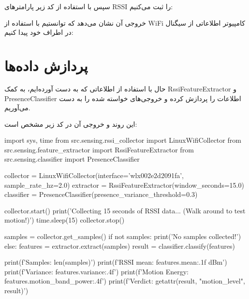 \documentclass[12pt, a4paper]{article}
\newcommand{\lr}[1]{\foreignlanguage{english}{#1}}
\begin{document}
سپس با استفاده از کد زیر پارامترهای \lr{RSSI} را ثبت می‌کنیم:

\begin{otherlanguage}{english}
\end{otherlanguage}

خروجی آن نشان می‌دهد که توانستیم با استفاده از \lr{WiFi} کامپیوتر اطلاعاتی از سیگنال در اطراف خود پیدا کنیم:

\begin{otherlanguage}{english}
\end{otherlanguage}

\section{پردازش داده‌ها}
حال با استفاده از اطلاعاتی که به دست آورده‌ایم، به کمک \lr{RssiFeatureExtractor} و \lr{PresenceClassifier} اطلاعات را پردازش کرده و خروجی‌های خواسته شده را به دست می‌آوریم. 

این روند و خروجی آن در کد زیر مشخص است:

\begin{otherlanguage}{english}
\begin{codebox}
import sys, time
from src.sensing.rssi_collector import LinuxWifiCollector
from src.sensing.feature_extractor import RssiFeatureExtractor
from src.sensing.classifier import PresenceClassifier

collector = LinuxWifiCollector(interface='wlx002e2d2091fa', sample_rate_hz=2.0)
extractor = RssiFeatureExtractor(window_seconds=15.0)
classifier = PresenceClassifier(presence_variance_threshold=0.3)

collector.start()
print('Collecting 15 seconds of RSSI data... (Walk around to test motion!)')
time.sleep(15)
collector.stop()

samples = collector.get_samples()
if not samples:
    print('No samples collected!')
else:
    features = extractor.extract(samples)
    result = classifier.classify(features)
    
    print(f'Samples: {len(samples)}')
    print(f'RSSI mean: {features.mean:.1f} dBm')
    print(f'Variance: {features.variance:.4f}')
    print(f'Motion Energy: {features.motion_band_power:.4f}')
    print(f'Verdict: {getattr(result, "motion_level", result)}')
\end{codebox}
\end{otherlanguage}
\end{document}
